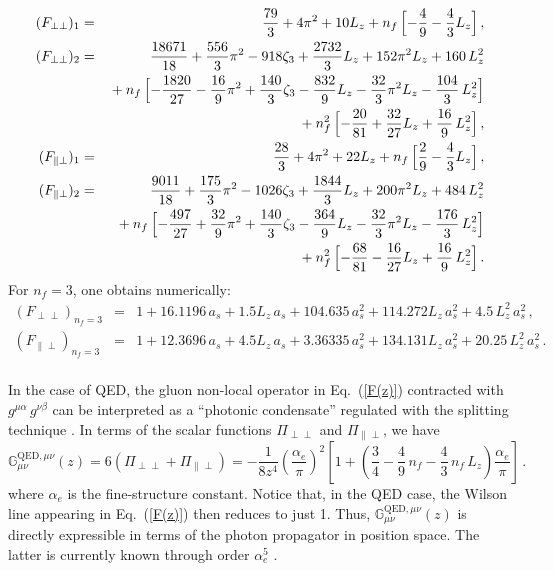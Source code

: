 \documentclass[12pt]{article}
\numberwithin{equation}{section}
\newcommand{\1}[1]{\mathbf{1}^{#1}}
\newcommand{\2}[1]{\mathbf{2}^{#1}}
\newcommand{\3}[1]{\mathbf{3}^{#1}}
\newcommand{\4}[1]{\mathbf{4}^{#1}}
\newcommand{\5}[1]{\mathbf{5}^{#1}}
\newcommand{\EQN}[1]{\hspace{3mm}\fbox{\fbox{$#1$}} \label{#1}}
\newcommand{\mlabel}[1]{ \text{\footnotesize \hspace{3mm}\fbox{\fbox{$#1$}} \label{#1}}}
\renewcommand{\EQN}[1]{\mlabel{#1}}
\renewcommand{\mlabel}[1]{\label{#1}}
\renewcommand{\EQN}[1]{\label{#1}}
\newcommand{\nnb}{\nonumber}
\newcommand{\beq}{\begin{equation}}
\newcommand{\eeq}{\end{equation}}
\newcommand{\re}[1]{(\ref{#1})}
\newcommand{\al}{\alpha}
\newcommand{\F}{\mathbb{G}}
\newcommand{\TT}{{\perp\perp}}
\newcommand{\PT}{{\parallel\perp}}
\newcommand{\NEQN}[1]{\nnb}
\begin{document}
\begin{eqnarray}
 (F_\TT)_1&=&
\frac{79}{3}+4 \pi^2+10 L_z  
+n_f\, \Bigl[-\frac{4}{9}-\frac{4}{3} L_z  \Bigr]\,,
\nonumber\\
(F_\TT)_2&=&
\frac{18671}{18}+\frac{556}{3} \pi^2-918  \zeta_{3}+\frac{2732}{3} L_z  +152 \pi^2 L_z  +160 \, L_z^2
\nonumber\\
&&{}+n_f\, \Bigl[-\frac{1820}{27}-\frac{16}{9} \pi^2+\frac{140}{3}  \zeta_{3}-\frac{832}{9} L_z  -\frac{32}{3} \pi^2 L_z  -\frac{104}{3} \, L_z^2\Bigr]
\nonumber\\
&&{}+n_f^2\, \Bigl[-\frac{20}{81}+\frac{32}{27} L_z  +\frac{16}{9} \, L_z^2\Bigr]
\,,
\nonumber\\
(F_\PT)_1&=&
\frac{28}{3}+4 \pi^2+22 L_z  
+n_f\, \Bigl[\frac{2}{9}-\frac{4}{3} L_z  \Bigr]\,,
\nonumber\\
(F_\PT)_2&=&
\frac{9011}{18}+\frac{175}{3} \pi^2-1026  \zeta_{3}+\frac{1844}{3} L_z  +200 \pi^2 L_z  +484 \, L_z^2
\nonumber\\
&&{}+n_f\, \Bigl[-\frac{497}{27}+\frac{32}{9} \pi^2+\frac{140}{3}  \zeta_{3}-\frac{364}{9} L_z  -\frac{32}{3} \pi^2 L_z  -\frac{176}{3} \, L_z^2\Bigr]
\nonumber\\
&&{}+n_f^2\, \Bigl[-\frac{68}{81}-\frac{16}{27} L_z  +\frac{16}{9} \, L_z^2\Bigr]\,.
\end{eqnarray}
For $n_f=3$, one obtains numerically:
\begin{eqnarray}
 (F_\TT)_{n_f=3} &=&1+16.1196 \,a_s +1.5 L_z   \,a_s +104.635 \, a_s^2 +114.272 L_z   \, a_s^2 +4.5 \, L_z^2 \, a_s^2\,, 
\nonumber\\
(F_\PT)_{n_f=3} &=&1+12.3696 \,a_s +4.5 L_z   \,a_s +3.36335 \, a_s^2 +134.131 L_z   \, a_s^2 +20.25 \, L_z^2 \, a_s^2\,.
\nonumber\\
&&
\end{eqnarray}

\newcommand{\als}{\left(\frac{\alpha_e}{\pi}\right)}

In the case of QED, the gluon non-local operator in Eq.~\re{F(z)} contracted with $g^{\mu\al}\, g^{\nu\beta}$
can be interpreted as a ``photonic condensate'' regulated with the splitting technique \cite{Vainshtein:1989ve}. 
In terms of the 
scalar functions $\Pi_\TT$ and $\Pi_\PT$, we have
\beq
\F^{\text{QED},\mu\nu}_{\mu\nu}(z) = 6\left(\Pi_\TT + \Pi_\PT\right)= -\frac{1}{8 z^4} \als^2
\left[
1 + \left(\frac{3}{4} -\frac{4}{9}\, n_f - \frac{4}{3}\, n_f\, L_z\right)\frac{\alpha_e}{\pi}
\right]
\,.
\eeq
where $\alpha_e$ is the fine-structure constant.
Notice that, in the QED case, the Wilson line appearing in Eq.~\re{F(z)} then
reduces to just 1. Thus, 
$\F^{\text{QED},\mu\nu}_{\mu\nu}(z)$ is directly expressible in terms of the photon
propagator in position space. The latter is currently known through order
$\alpha_e^5$ \cite{Chetyrkin:2010dx,Baikov:2012zm}.
\end{document}
